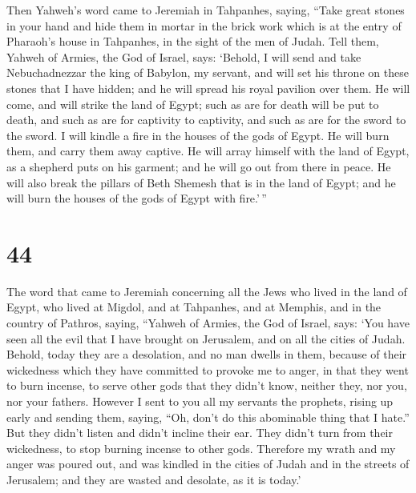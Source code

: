  Then Yahweh's word came to Jeremiah in Tahpanhes, saying,
 ``Take great stones in your hand and hide them in mortar
in the brick work which is at the entry of Pharaoh's house in Tahpanhes,
in the sight of the men of Judah.  Tell them, Yahweh of
Armies, the God of Israel, says: `Behold, I will send and take
Nebuchadnezzar the king of Babylon, my servant, and will set his throne
on these stones that I have hidden; and he will spread his royal
pavilion over them.  He will come, and will strike the
land of Egypt; such as are for death will be put to death, and such as
are for captivity to captivity, and such as are for the sword to the
sword.  I will kindle a fire in the houses of the gods of
Egypt. He will burn them, and carry them away captive. He will array
himself with the land of Egypt, as a shepherd puts on his garment; and
he will go out from there in peace.  He will also break
the pillars of Beth Shemesh that is in the land of Egypt; and he will
burn the houses of the gods of Egypt with fire.'\,''

\hypertarget{section-43}{%
\section{44}\label{section-43}}

 The word that came to Jeremiah concerning all the Jews
who lived in the land of Egypt, who lived at Migdol, and at Tahpanhes,
and at Memphis, and in the country of Pathros, saying, 
``Yahweh of Armies, the God of Israel, says: `You have seen all the evil
that I have brought on Jerusalem, and on all the cities of Judah.
Behold, today they are a desolation, and no man dwells in them,
 because of their wickedness which they have committed to
provoke me to anger, in that they went to burn incense, to serve other
gods that they didn't know, neither they, nor you, nor your fathers.
 However I sent to you all my servants the prophets,
rising up early and sending them, saying, ``Oh, don't do this abominable
thing that I hate.''  But they didn't listen and didn't
incline their ear. They didn't turn from their wickedness, to stop
burning incense to other gods.  Therefore my wrath and my
anger was poured out, and was kindled in the cities of Judah and in the
streets of Jerusalem; and they are wasted and desolate, as it is today.'

